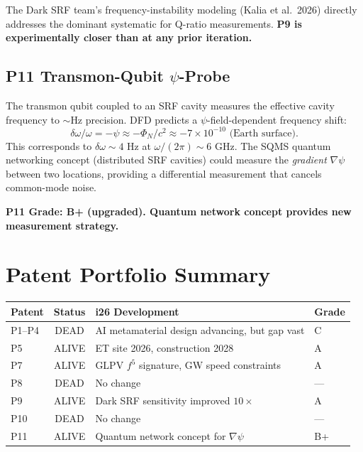\documentclass[11pt,a4paper]{article}
\begin{document}
The Dark SRF team's frequency-instability modeling (Kalia et al.\ 2026) directly addresses the dominant systematic for Q-ratio measurements. \textbf{P9 is experimentally closer than at any prior iteration.}

\subsection{P11 Transmon-Qubit $\psi$-Probe}

The transmon qubit coupled to an SRF cavity measures the effective cavity frequency to $\sim$Hz precision. DFD predicts a $\psi$-field-dependent frequency shift:
\begin{equation}
\delta\omega / \omega = -\psi \approx -\Phi_N / c^2 \approx -7\times10^{-10} \text{ (Earth surface)}.
\end{equation}
This corresponds to $\delta\omega \sim 4$ Hz at $\omega/(2\pi) \sim 6$ GHz. The SQMS quantum networking concept (distributed SRF cavities) could measure the \emph{gradient} $\nabla\psi$ between two locations, providing a differential measurement that cancels common-mode noise.

\textbf{P11 Grade: B+ (upgraded). Quantum network concept provides new measurement strategy.}

\section{Patent Portfolio Summary}

\begin{center}
\begin{tabular}{lcll}
\toprule
\textbf{Patent} & \textbf{Status} & \textbf{i26 Development} & \textbf{Grade} \\
\midrule
P1--P4 & DEAD & AI metamaterial design advancing, but gap vast & C \\
P5 & ALIVE & ET site 2026, construction 2028 & A \\
P7 & ALIVE & GLPV $f^5$ signature, GW speed constraints & A \\
P8 & DEAD & No change & --- \\
P9 & ALIVE & Dark SRF sensitivity improved $10\times$ & A \\
P10 & DEAD & No change & --- \\
P11 & ALIVE & Quantum network concept for $\nabla\psi$ & B+ \\
\bottomrule
\end{tabular}
\end{center}
\end{document}
